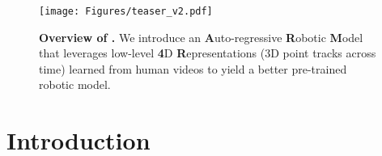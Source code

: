 \begin{figure*}[t!]
    \centering
    \texttt{[image: Figures/teaser\_v2.pdf]}
    
    \caption{\textbf{Overview of \smodel{}.} We introduce an \textbf{A}uto-regressive \textbf{R}obotic \textbf{M}odel that leverages low-level \textbf{4}D \textbf{R}epresentations (3D point tracks across time) learned from human videos to yield a better pre-trained robotic model.}
    \label{fig:teaser}
\end{figure*}


\section{Introduction}
\label{sec:intro}











